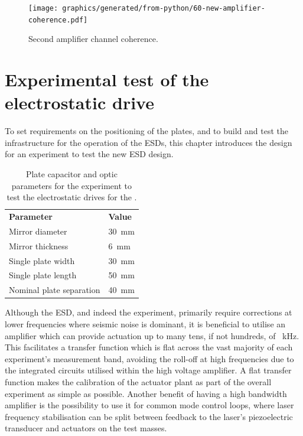 \begin{figure}
  \centering
  \texttt{[image: graphics/generated/from-python/60-new-amplifier-coherence.pdf]}
  \caption[High voltage amplifier cross-channel coherence]{Second amplifier channel coherence.}
  \label{fig:new-amplifier-coherence}
\end{figure}

\section{Experimental test of the electrostatic drive}
To set requirements on the positioning of the plates, and to build and test the infrastructure for the operation of the \glspl{ESD}, this chapter introduces the design for an experiment to test the new \gls{ESD} design.

\begin{table}
  \centering
  \begin{tabular}{ll}
    \textbf{Parameter}   & \textbf{Value} \\
    Mirror diameter      & \SI{30}{\milli\meter} \\
    Mirror thickness     & \SI{6}{\milli\meter} \\
    Single plate width   & \SI{30}{\milli\meter} \\
    Single plate length  & \SI{50}{\milli\meter} \\
    Nominal plate separation & \SI{40}{\milli\meter} \\
  \end{tabular}
  \caption[Plate capacitor and optic parameters for the experiment to test the electrostatic drives for the \SSM{}]{\label{tab:esd-expt-parameters}Plate capacitor and optic parameters for the experiment to test the electrostatic drives for the \SSM{}.}
\end{table}

Although the \gls{ESD}, and indeed the \SSM{} experiment, primarily require corrections at lower frequencies where seismic noise is dominant, it is beneficial to utilise an amplifier which can provide actuation up to many tens, if not hundreds, of \SI{}{\kilo\hertz}. This facilitates a transfer function which is flat across the vast majority of each experiment's measurement band, avoiding the roll-off at high frequencies due to the integrated circuits utilised within the high voltage amplifier. A flat transfer function makes the calibration of the actuator plant as part of the overall experiment as simple as possible. Another benefit of having a high bandwidth amplifier is the possibility to use it for common mode control loops, where laser frequency stabilisation can be split between feedback to the laser's piezoelectric transducer and actuators on the test masses.


